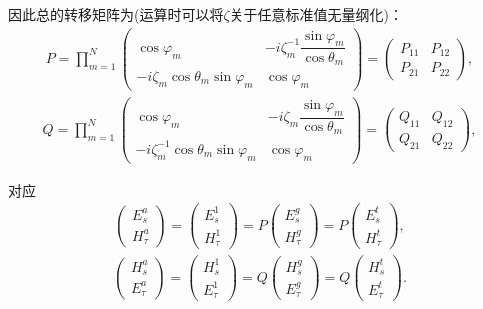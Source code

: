 因此总的转移矩阵为(运算时可以将\(\zeta\)关于任意标准值无量纲化)：
\begin{align*}
	P = \prod_{m=1}^{N}
	\begin{pmatrix}
		\cos\varphi_m                      & -i\zeta_m^{-1}\dfrac{\sin\varphi_m}{\cos\theta_m} \\
		-i\zeta_m\cos\theta_m\sin\varphi_m & \cos\varphi_m
	\end{pmatrix}
	=
	\begin{pmatrix}
		P_{11} & P_{12} \\
		P_{21} & P_{22}
	\end{pmatrix},
\end{align*}
\begin{align*}
	Q = \prod_{m=1}^{N}
	\begin{pmatrix}
		\cos\varphi_m                           & -i\zeta_m\dfrac{\sin\varphi_m}{\cos\theta_m} \\
		-i\zeta_m^{-1}\cos\theta_m\sin\varphi_m & \cos\varphi_m
	\end{pmatrix}
	=
	\begin{pmatrix}
		Q_{11} & Q_{12} \\
		Q_{21} & Q_{22}
	\end{pmatrix},
\end{align*}

对应
\begin{align*}
	\begin{pmatrix}
		E_s^a \\
		H_\tau^a
	\end{pmatrix}
	=
	\begin{pmatrix}
		E_s^1 \\
		H_\tau^1
	\end{pmatrix}
	= P
	\begin{pmatrix}
		E_s^g \\
		H_\tau^g
	\end{pmatrix}
	= P
	\begin{pmatrix}
		E_s^t \\
		H_\tau^t
	\end{pmatrix},
\end{align*}
\begin{align*}
	\begin{pmatrix}
		H_s^a \\
		E_\tau^a
	\end{pmatrix}
	=
	\begin{pmatrix}
		H_s^1 \\
		E_\tau^1
	\end{pmatrix}
	= Q
	\begin{pmatrix}
		H_s^g \\
		E_\tau^g
	\end{pmatrix}
	= Q
	\begin{pmatrix}
		H_s^t \\
		E_\tau^t
	\end{pmatrix}.
\end{align*}

